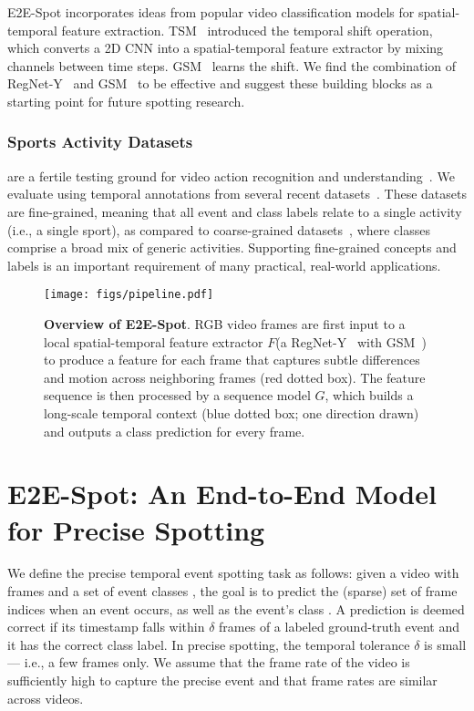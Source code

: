 \documentclass[runningheads]{llncs}
\newcommand{\notation}[1]{\ensuremath{#1}\xspace}
\newcommand{\OURMETHOD}{{E2E-Spot}\xspace}
\newcommand{\Tolerance}{\notation{\delta}}
\newcommand{\FeatureExtractor}{\notation{F}}
\newcommand{\TemporalArchitecture}{\notation{G}}
\begin{document}
\OURMETHOD incorporates ideas from popular video classification models for spatial-temporal feature extraction.
TSM~\cite{tsm} introduced the temporal shift operation, which converts a 2D CNN into a spatial-temporal feature extractor by mixing channels between time steps.
GSM~\cite{gsm} learns the shift.
We find the combination of RegNet-Y~\cite{regnet} and GSM~\cite{gsm} to be effective and suggest these building blocks as a starting point for future spotting research.

\subsubsection*{Sports Activity Datasets} are a fertile testing ground for
video action recognition and understanding~\cite{soccernetv2,cbdqsa,vpd,volleyball,diving48,multisports,finegym,finediving,vid2player}.
We evaluate using temporal annotations
from several recent datasets~\cite{soccernetv2,vpd,finegym,finediving,vid2player}.
These datasets are fine-grained, meaning that all event and class labels relate to a single activity (i.e., a single sport), as compared to coarse-grained datasets~\cite{activitynet,thumos14}, where classes comprise a broad mix of generic activities.
Supporting fine-grained concepts and labels is an important requirement of many practical, real-world applications.
 
\begin{figure}[t]
	\centering
	\texttt{[image: figs/pipeline.pdf]}
	\caption{{\bf Overview of \OURMETHOD}.
RGB video frames are first input to a local spatial-temporal feature extractor \FeatureExtractor (a RegNet-Y~\cite{regnet} with GSM~\cite{gsm}) to produce a feature for each frame that captures subtle differences and motion across neighboring frames (red dotted box).
The feature sequence is then processed by a sequence model \TemporalArchitecture, which builds a long-scale temporal context (blue dotted box; one direction drawn) and outputs a class prediction for every frame.
		}
	\label{fig:pipeline}
\end{figure}
 
\section{\OURMETHOD: An End-to-End Model for Precise Spotting}
\label{sec:method}

We define the precise temporal event spotting task as follows: given a
video with  frames  and a set of  event
classes , the goal is to predict the (sparse) set of frame indices when an event occurs, as well as the event's class .
A prediction is deemed correct if its timestamp falls within
\Tolerance frames of a labeled ground-truth event and it has the correct class label.
In precise spotting, the temporal tolerance \Tolerance is small --- i.e., a few
frames only.
We assume that the frame rate of the video is sufficiently high to capture the precise event and that frame rates are similar across videos.
\end{document}
